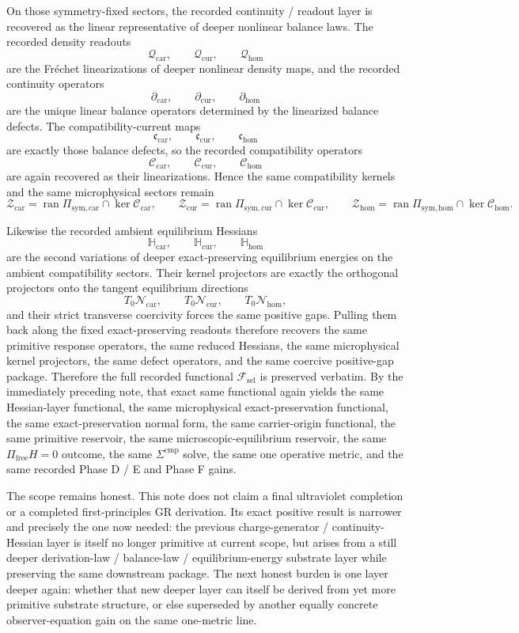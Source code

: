 \documentclass[11pt]{article}
\newcommand{\StemFunctional}{\mathscr F_{\mathrm{sel}}}
\newcommand{\UltraTensorClass}{\mathscr Z_{\mathrm{car}}}
\newcommand{\UltraRelabelClass}{\mathscr Z_{\mathrm{cur}}}
\newcommand{\UltraFreeClass}{\mathscr Z_{\mathrm{hom}}}
\newcommand{\TensorSymProj}{\Pi_{\mathrm{sym,car}}}
\newcommand{\CurSymProj}{\Pi_{\mathrm{sym,cur}}}
\newcommand{\HomSymProj}{\Pi_{\mathrm{sym,hom}}}
\newcommand{\TensorCompat}{\mathcal C_{\mathrm{car}}}
\newcommand{\CurCompat}{\mathcal C_{\mathrm{cur}}}
\newcommand{\HomCompat}{\mathcal C_{\mathrm{hom}}}
\newcommand{\TensorCurrent}{\mathfrak c_{\mathrm{car}}}
\newcommand{\CurCurrent}{\mathfrak c_{\mathrm{cur}}}
\newcommand{\HomCurrent}{\mathfrak c_{\mathrm{hom}}}
\newcommand{\TensorDensity}{\mathcal Q_{\mathrm{car}}}
\newcommand{\CurDensity}{\mathcal Q_{\mathrm{cur}}}
\newcommand{\HomDensity}{\mathcal Q_{\mathrm{hom}}}
\newcommand{\TensorCont}{\partial_{\mathrm{car}}}
\newcommand{\CurCont}{\partial_{\mathrm{cur}}}
\newcommand{\HomCont}{\partial_{\mathrm{hom}}}
\newcommand{\TensorAmbientHess}{\mathbb H_{\mathrm{car}}}
\newcommand{\CurAmbientHess}{\mathbb H_{\mathrm{cur}}}
\newcommand{\HomAmbientHess}{\mathbb H_{\mathrm{hom}}}
\newcommand{\TensorEqManifold}{\mathcal N_{\mathrm{car}}}
\newcommand{\CurEqManifold}{\mathcal N_{\mathrm{cur}}}
\newcommand{\HomEqManifold}{\mathcal N_{\mathrm{hom}}}
\begin{document}
On those symmetry-fixed sectors, the recorded continuity / readout layer is recovered as the linear representative of deeper nonlinear balance laws. The recorded density readouts
\[
\TensorDensity,\qquad
\CurDensity,\qquad
\HomDensity
\]
are the Fr\'echet linearizations of deeper nonlinear density maps, and the recorded continuity operators
\[
\TensorCont,\qquad
\CurCont,\qquad
\HomCont
\]
are the unique linear balance operators determined by the linearized balance defects. The compatibility-current maps
\[
\TensorCurrent,\qquad
\CurCurrent,\qquad
\HomCurrent
\]
are exactly those balance defects, so the recorded compatibility operators
\[
\TensorCompat,\qquad
\CurCompat,\qquad
\HomCompat
\]
are again recovered as their linearizations. Hence the same compatibility kernels and the same microphysical sectors remain
\[
\UltraTensorClass=\operatorname{ran}\TensorSymProj\cap\ker\TensorCompat,\qquad
\UltraRelabelClass=\operatorname{ran}\CurSymProj\cap\ker\CurCompat,\qquad
\UltraFreeClass=\operatorname{ran}\HomSymProj\cap\ker\HomCompat.
\]

Likewise the recorded ambient equilibrium Hessians
\[
\TensorAmbientHess,\qquad
\CurAmbientHess,\qquad
\HomAmbientHess
\]
are the second variations of deeper exact-preserving equilibrium energies on the ambient compatibility sectors. Their kernel projectors are exactly the orthogonal projectors onto the tangent equilibrium directions
\[
T_0\TensorEqManifold,\qquad
T_0\CurEqManifold,\qquad
T_0\HomEqManifold,
\]
and their strict transverse coercivity forces the same positive gaps. Pulling them back along the fixed exact-preserving readouts therefore recovers the same primitive response operators, the same reduced Hessians, the same microphysical kernel projectors, the same defect operators, and the same coercive positive-gap package. Therefore the full recorded functional \(\StemFunctional\) is preserved verbatim. By the immediately preceding note, that exact same functional again yields the same Hessian-layer functional, the same microphysical exact-preservation functional, the same exact-preservation normal form, the same carrier-origin functional, the same primitive reservoir, the same microscopic-equilibrium reservoir, the same \(\Pi_{\mathrm{free}}H=0\) outcome, the same \(\Sigma^{\mathrm{cmp}}\) solve, the same one operative metric, and the same recorded Phase D / E and Phase F gains.

The scope remains honest. This note does not claim a final ultraviolet completion or a completed first-principles GR derivation. Its exact positive result is narrower and precisely the one now needed: the previous charge-generator / continuity-Hessian layer is itself no longer primitive at current scope, but arises from a still deeper derivation-law / balance-law / equilibrium-energy substrate layer while preserving the same downstream package. The next honest burden is one layer deeper again: whether that new deeper layer can itself be derived from yet more primitive substrate structure, or else superseded by another equally concrete observer-equation gain on the same one-metric line.
\end{document}
